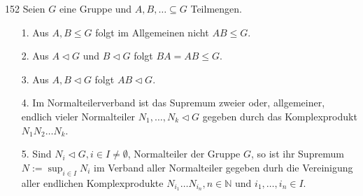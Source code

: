 \begin{algebraUE}{152}
Seien $G$ eine Gruppe und $A,B,\dots \subseteq G$ Teilmengen.
\begin{itemize}
  \item [1.] Aus $A,B \leq G$ folgt im Allgemeinen nicht $AB \leq G$.
  \item [2.] Aus $A \vartriangleleft G$ und $B \vartriangleleft G$ folgt $BA = AB \leq G$.
  \item [3.] Aus $A,B \vartriangleleft G$ folgt $AB \vartriangleleft G$.
  \item [4.] Im Normalteilerverband ist das Supremum zweier oder, allgemeiner,
  endlich vieler Normalteiler $N_1,\dots,N_k \vartriangleleft G$ gegeben durch
  das Komplexprodukt $N_1N_2\dots N_k$.
  \item [5.] Sind $N_i \vartriangleleft G, i \in I \neq \emptyset$, Normalteiler
  der Gruppe $G$, so ist ihr Supremum $N := \sup_{i \in I}N_i$ im Verband aller
  Normalteiler gegeben durh die Vereinigung aller endlichen Komplexprodukte
  $N_{i_1}\dots N_{i_n}, n \in \mathbb{N}$ und $i_1,\dots,i_n \in I$.
\end{itemize}
\end{algebraUE}
